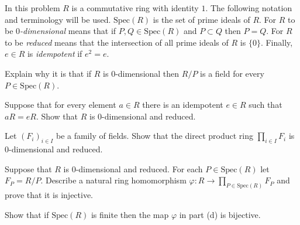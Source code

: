 In this problem $R$ is a commutative ring with identity $1$. The
following notation and terminology will be used. $\mathrm{Spec}(R)$ is
the set of prime ideals of $R$. For $R$ to be \emph{$0$-dimensional}
means that if $P,Q\in \mathrm{Spec}(R)$ and $P\subset Q$ then $P=Q$.
For $R$ to be \emph{reduced} means that the intersection of all prime
ideals of $R$ is $\{0\}$. Finally, $e\in R$ is \emph{idempotent} if
$e^2=e$.
\begin{alist}
\item Explain why it is that if $R$ is $0$-dimensional then $R/P$ is
a field for every $P\in \mathrm{Spec}(R)$.
\item Suppose that for every element $a\in R$ there is an idempotent
$e\in R$ such that $aR=eR$. Show that $R$ is $0$-dimensional and
reduced.
\item Let $(F_i)_{i\in I}$ be a family of fields. Show that the direct
product ring $\prod_{i\in I}F_i$ is $0$-dimensional and reduced.
\item Suppose that $R$ is $0$-dimensional and reduced. For each $P\in
\mathrm{Spec}(R)$ let $F_P=R/P$. Describe a natural ring homomorphism
$\varphi:R\rightarrow \prod_{P\in \mathrm{Spec}(R)}F_P$ and prove that
it is injective.
\item Show that if $\mathrm{Spec}(R)$ is finite then the map $\varphi$ 
in part (d) is bijective.
\end{alist}
